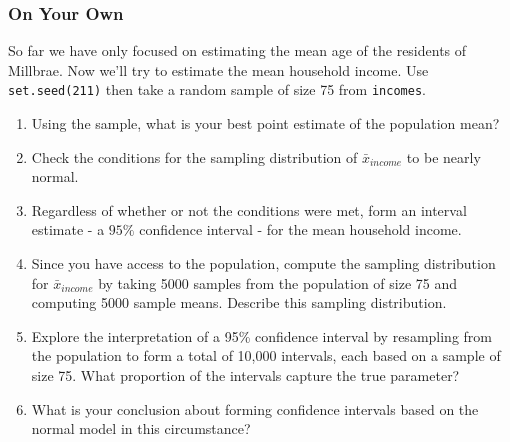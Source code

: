 \documentclass[11pt]{article}
\begin{document}
\subsubsection*{On Your Own}
So far we have only focused on estimating the mean age of the residents of Millbrae.  Now we'll try to estimate the mean household income.  Use \texttt{set.seed(211)} then take a random sample of size 75 from \texttt{incomes}.
\begin{enumerate}
\item Using the sample, what is your best point estimate of the population mean?
\item Check the conditions for the sampling distribution of $\bar{x}_{income}$ to be nearly normal.
\item Regardless of whether or not the conditions were met, form an interval estimate - a $95\%$ confidence interval - for the mean household income.
\item Since you have access to the population, compute the sampling distribution for $\bar{x}_{income}$ by taking 5000 samples from the population of size 75 and  computing 5000 sample means.  Describe this sampling distribution.
\item Explore the interpretation of a 95\% confidence interval by resampling from the population to form a total of 10,000 intervals, each based on a sample of size 75.  What proportion of the intervals capture the true parameter?
\item What is your conclusion about forming confidence intervals based on the normal model in this circumstance?

\end{enumerate}
\end{document}
